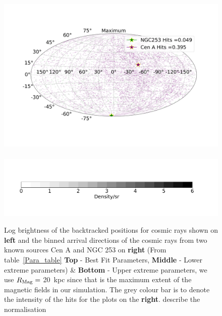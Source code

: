 \documentclass[usenatbib]{mnras}
\newcommand{\Vasu}[1]{{\color{purple}#1}}
\begin{document}
\begin{figure}
\includegraphics[width=0.49\linewidth]{Images/Bins_180_UB_N2_CenA_NGC253_Str_Tur_TM_40_EeV.png}\
\hspace*{+9cm}                                      \includegraphics[width=0.50\linewidth]{Images/Colorbar.png}
\caption{Log brightness of the backtracked positions for cosmic rays shown on \textbf{left} and the binned arrival directions of the cosmic rays from two known sources Cen A and NGC 253 on \textbf{right} (From table~\ref{Para_table} \textbf{Top} - Best Fit Parameters, {\textbf{Middle} - Lower extreme parameters)} \& {\textbf{Bottom} - Upper extreme parameters, we use $R_{\rm Mag} = $ 20~kpc since that is the maximum extent of the magnetic fields in our simulation. The grey colour bar is to denote the intensity of the hits for the plots on the \textbf{right}. }
\Vasu{describe the normalisation}}
\label{fig:AD_Plots}
\end{figure}

\end{document}
